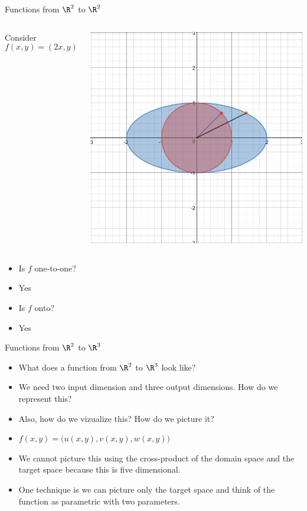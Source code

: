 \documentclass{beamer}
\begin{document}
\begin{frame}{Functions from $\R^2$ to $\R^2$}

\begin{columns}
\column[T]{5cm}
Consider
$$f(x,y) = (2x, y)$$

\column[T]{5cm}
\includegraphics[scale=0.25]{circle-to-ellipse}
\end{columns}
\begin{itemize}
\item Is $f$ one-to-one?
\item Yes
\item Is $f$ onto?
\item Yes
\end{itemize}

\end{frame}

\begin{frame}{Functions from $\R^2$ to $\R^3$}
\begin{itemize}
\item What does a function from $\R^2$ to $\R^3$ look like?
\item We need two input dimension and three output dimensions.
How do we represent this?
\item Also, how do we vizualize this? How do we picture it?
\item $f(x,y) = \big( u(x,y), v(x,y), w(x,y) \big)$
\item We cannot picture this using the cross-product of the domain space
and the target space because this is five dimensional.
\item One technique is we can picture only the target space and think
of the function as parametric with two parameters.
\end{itemize}
\end{frame}
\end{document}
